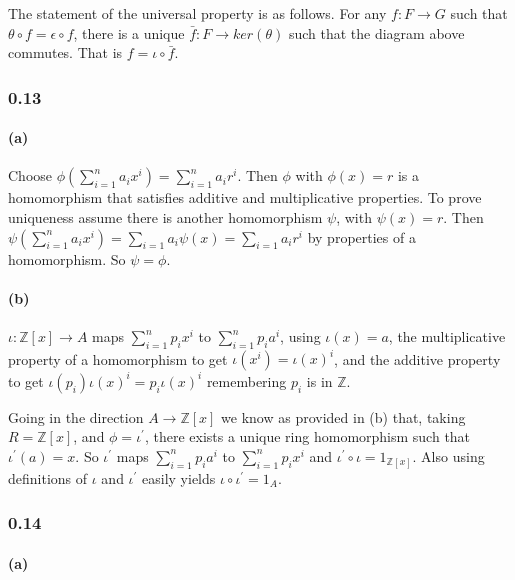\documentclass{article}
\begin{document}
The statement of the universal property is as follows. For any $f\colon F \rightarrow G$ such that $\theta \circ f = \epsilon \circ f$, there is a unique $\bar{f}\colon F \rightarrow ker(\theta)$ such that the diagram above commutes. That is $f = \iota \circ \bar{f}$. \\

\subsubsection*{0.13}
\paragraph{(a)}
Choose $\phi(\sum_{i=1}^na_ix^i) = \sum_{i=1}^na_ir^i$. Then $\phi$ with $\phi(x)=r$ is a homomorphism that
satisfies additive and multiplicative properties. To prove uniqueness assume there is another
homomorphism $\psi$, with $\psi(x)=r$. Then $\psi(\sum_{i=1}^na_ix^i) = \sum_{i=1}a_i\psi(x) = \sum_{i=1}a_ir^i$ by properties of
a homomorphism. So $\psi=\phi$. \par

\paragraph{(b)}
$\iota \colon \mathds{Z}[x] \rightarrow A$ maps
$\sum_{i=1}^n p_ix^i$ to $\sum_{i=1}^n p_ia^i$, using $\iota(x) = a$,
the multiplicative property of a homomorphism to get $\iota(x^i)=\iota(x)^i$,
and the additive property to get $\iota(p_i)\iota(x)^i = p_i\iota(x)^i$ remembering $p_i$ is in $\mathds{Z}$. \par

Going in the direction $A \rightarrow \mathds{Z}[x]$ we know as provided in (b) that,
taking $R=\mathds{Z}[x]$, and $\phi=\iota^\prime$, there exists a unique ring homomorphism such that $\iota^\prime(a)=x$.
So $\iota^\prime $ maps $\sum_{i=1}^np_ia^i$ to $\sum_{i=1}^{n}p_ix^i$ and $\iota^\prime \circ \iota = 1_{\mathds{Z}[x]}$.
Also using definitions of $\iota$ and $\iota^\prime$ easily yields $\iota \circ \iota^\prime = 1_A$.

\subsubsection*{0.14}
\paragraph{(a)}
\end{document}
